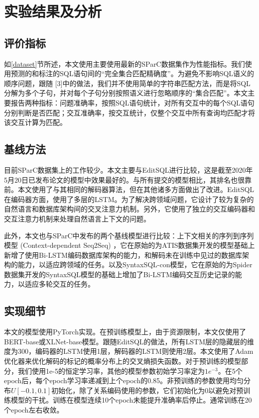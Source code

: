 \chapter{实验结果及分析}

\section{评价指标}

如\ref{dataset}节所述，本文使用主要使用最新的SParC数据集作为性能指标。我们使用预测的和标注的SQL语句间的“完全集合匹配精确度”。为避免不影响SQL语义的顺序问题，跟随 [3]中的做法，我们并不使用简单的字符串匹配方法，而是将SQL分解为多个子句，并对每个子句分别按照语义进行忽略顺序的“集合匹配”。本文主要报告两种指标：问题准确率，按照SQL语句统计，对所有交互中的每个SQL语句分别判断是否匹配；交互准确率，按交互统计，仅整个交互中所有查询均匹配才将该交互计算为匹配。

\section{基线方法}

目前SParC数据集上的工作较少。本文主要与EditSQL进行比较，这是截至2020年5月20日已发布论文的模型中效果最好的。与所有提交的模型相比，其排名也很靠前。本文使用了与其相同的解码器算法，但在其他诸多方面做出了改进。EditSQL在编码器方面，使用了多层的LSTM。为了解决跨领域问题，它设计了较为复杂的自然语言和数据库架构间的交叉注意力机制。另外，它使用了独立的交互编码器和交互注意力机制来处理自然语言上下文的问题。

此外，本文也与SParC\cite{sparc19}中发布的两个基线模型进行比较：上下文相关的序列到序列模型 (Context-dependent Seq2Seq) ，它在原始的为ATIS数据集开发的模型基础上新增了使用Bi-LSTM编码数据库架构的能力，和解码未在训练中见过的数据库架构的能力，以适应跨领域的任务。以及SyntaxSQL-con模型，它在原始的为Spider数据集开发的SyntaxSQL\cite{yu-etal-2018-syntaxsqlnet}模型的基础上增加了Bi-LSTM编码交互历史记录的能力，以适应多轮交互的任务。

\section{实现细节}

本文的模型使用PyTorch\cite{pytorch19}实现。在预训练模型上，由于资源限制，本文仅使用了BERT-base或XLNet-base模型。跟随EditSQL的做法，所有LSTM层的隐藏层的维度为300，编码器的LSTM使用1层，解码器的LSTM则使用2层。本文使用了Adam\cite{Adam14}优化器来优化解码的标记的概率分布上的交叉熵损失函数。对于预训练的模型部分，我们使用1e-5的恒定学习率，其他的模型参数初始学习率定为$1e^{-3}$。在5个epoch后，每个epoch学习率递减到上个epoch的0.85。非预训练的参数使用均匀分布$U\left[-0.1,0.1\right]$初始化，除了关系编码使用的参数，它们初始化为0以避免对预训练模型的干扰。训练在模型连续10个epoch未能提升准确率后停止。通常训练在20个epoch左右收敛。

